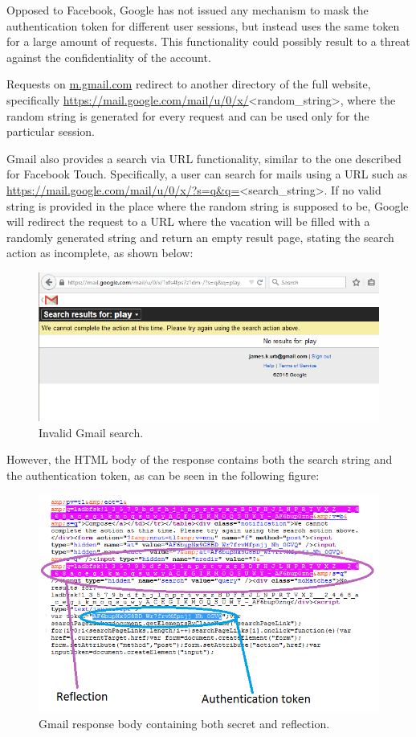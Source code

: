 Opposed to Facebook, Google has not issued any mechanism to mask the
authentication token for different user sessions, but instead uses the same
token for a large amount of requests. This functionality could possibly result
to a threat against the confidentiality of the account.

Requests on \url{m.gmail.com} redirect to another directory of the full website,
specifically \url{https://mail.google.com/mail/u/0/x/}<random\_string>, where
the random string is generated for every request and can be used only for the
particular session.

Gmail also provides a search via URL functionality, similar to the one described
for Facebook Touch. Specifically, a user can search for mails using a URL such
as \url{https://mail.google.com/mail/u/0/x/?s=q&q=}<search\_string>. If no
valid string is provided in the place where the random string is supposed
to be, Google will redirect the request to a URL where the vacation will be
filled with a randomly generated string and return an empty result page,
stating the search action as incomplete, as shown below:

\begin{figure}[h] \caption{Invalid Gmail search.} \centering
\includegraphics[width=1\textwidth]{diagrams/gmail_search.png}\end{figure}

However, the HTML body of the response contains both the search string and the
authentication token, as can be seen in the following figure:

\begin{figure}[h] \caption{Gmail response body containing both secret and
reflection.} \centering
\includegraphics[width=1\textwidth]{diagrams/gmail_response.png}\end{figure}

